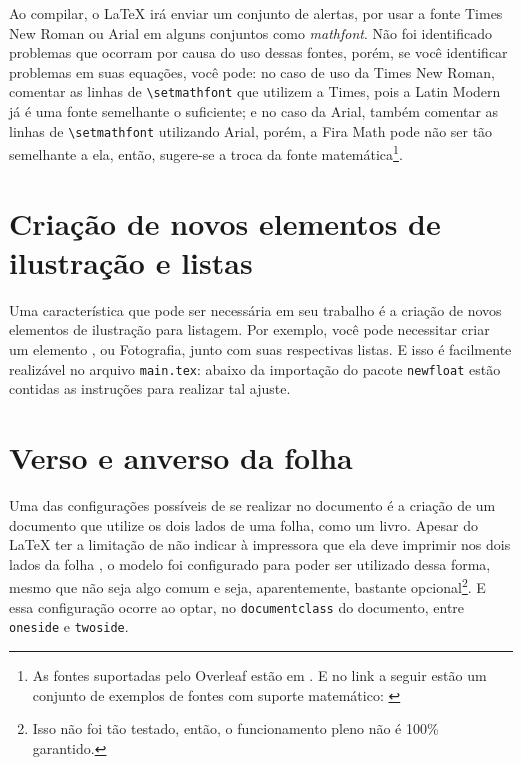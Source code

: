Ao compilar, o \LaTeX{} irá enviar um conjunto de alertas, por usar a fonte Times New Roman ou Arial em alguns conjuntos como \textit{mathfont}. Não foi identificado problemas que ocorram por causa do uso dessas fontes, porém, se você identificar problemas em suas equações, você pode: no caso de uso da Times New Roman, comentar as linhas de \verb|\setmathfont| que utilizem a Times, pois a Latin Modern já é uma fonte semelhante o suficiente; e no caso da Arial, também comentar as linhas de \verb|\setmathfont| utilizando Arial, porém, a Fira Math pode não ser tão semelhante a ela, então, sugere-se a troca da fonte matemática\footnote{As fontes suportadas pelo Overleaf estão em \textcite{site:overleaf-fontes-2023}. E no link a seguir estão um conjunto de exemplos de fontes com suporte matemático: \textcite{site:tex-fontes-2022}}.

\section{Criação de novos elementos de ilustração e listas}\label{section:novos-elementos}
Uma característica que pode ser necessária em seu trabalho é a criação de novos elementos de ilustração para listagem. Por exemplo, você pode necessitar criar um elemento , ou Fotografia, junto com suas respectivas listas. E isso é facilmente realizável no arquivo \texttt{main.tex}: abaixo da importação do pacote \texttt{newfloat} estão contidas as instruções para realizar tal ajuste.

\section{Verso e anverso da folha}
Uma das configurações possíveis de se realizar no documento é a criação de um documento que utilize os dois lados de uma folha, como um livro. Apesar do \LaTeX{} ter a limitação de não indicar à impressora que ela deve imprimir nos dois lados da folha \cite{site:latex-impressora}, o modelo foi configurado para poder ser utilizado dessa forma, mesmo que não seja algo comum e seja, aparentemente, bastante opcional\footnote{Isso não foi tão testado, então, o funcionamento pleno não é 100\% garantido.}. E essa configuração ocorre ao optar, no \texttt{documentclass} do documento, entre \texttt{oneside} e \texttt{twoside}.

